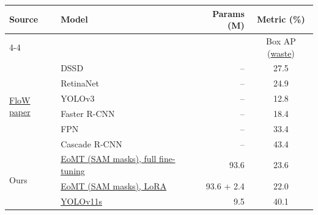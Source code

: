 \begin{table}[t]
\centering
\small
\begin{tabular}{l|lrc}
\toprule
\multirow{2}{*}{Source} & \multirow{2}{*}{Model} & \multirow{2}{*}{Params (M)} & \multicolumn{1}{c}{Metric (\%)} \\
\cmidrule(lr){4-4}
 & & & Box AP (\hyperlink{cls:waste}{waste}) \\
\midrule
\multirow{6}{*}{\href{https://openaccess.thecvf.com/content/ICCV2021/papers/Cheng_FloW_A_Dataset_and_Benchmark_for_Floating_Waste_Detection_in_ICCV_2021_paper.pdf}{FloW paper}} & DSSD & -- & 27.5 \\
 & RetinaNet & -- & 24.9 \\
 & YOLOv3 & -- & 12.8 \\
 & Faster R-CNN & -- & 18.4 \\
 & FPN & -- & 33.4 \\
 & Cascade R-CNN & -- & 43.4 \\
\midrule
\multirow{3}{*}{Ours} & \hyperlink{abl:F3}{EoMT (SAM masks), full fine-tuning} & 93.6 & 23.6 \\
 & \hyperlink{abl:F4}{EoMT (SAM masks), LoRA} & 93.6 + 2.4 & 22.0 \\
 & \hyperlink{abl:F3}{YOLOv11s} & 9.5 & 40.1 \\
\midrule

\end{tabular}
\end{table}
